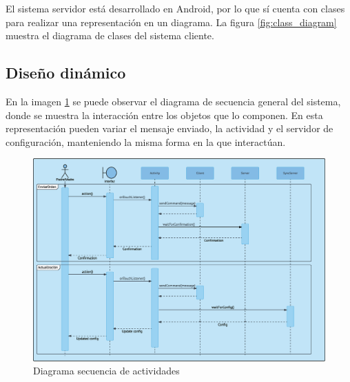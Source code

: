 \documentclass[12pt, twoside]{article}
\begin{document}
        El sistema servidor está desarrollado en Android, por lo que sí cuenta con clases para realizar una representación en un diagrama. La figura \ref{fig:class_diagram} muestra el diagrama de clases del sistema cliente.
        

    \subsection{Diseño dinámico}
    En la imagen \ref{fig:main_activity_sequence_diagram} se puede observar el diagrama de secuencia general del sistema, donde se muestra la interacción entre los objetos que lo componen. En esta representación pueden variar el mensaje enviado, la actividad y el servidor de configuración, manteniendo la misma forma en la que interactúan.

    \begin{figure}[h!]
    \centering
        \includegraphics[scale=0.32]{main_activity_sequence_diagram.eps}
        \caption{Diagrama secuencia de actividades}
        \label{fig:main_activity_sequence_diagram}
    \end{figure}
\end{document}
